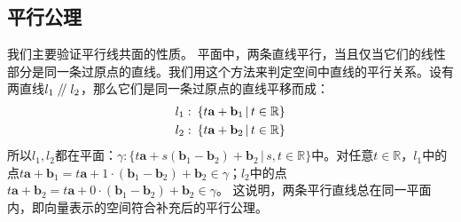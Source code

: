 \documentclass[12pt,UTF8]{ctexbook}
\renewcommand\parallel{\mathrel{/\mskip-4mu/}}
\begin{document}
\begin{appendix}
\section{平行公理}
我们主要验证平行线共面的性质。
平面中，两条直线平行，当且仅当它们的线性部分是同一条过原点的直线。我们用这个方法来判定空间中直线的平行关系。设有两直线$l_1\parallel l_2$，那么它们是同一条过原点的直线平移而成：
\begin{align}
l_1: & \,\,\, \{t\mathbf{a} + \mathbf{b}_1 \, | \, t\in\mathbb{R}\} \notag \\
l_2: & \,\,\, \{t\mathbf{a} + \mathbf{b}_2 \, | \, t\in\mathbb{R}\} \notag
\end{align}
所以$l_1,l_2$都在平面：$\gamma : \{t\mathbf{a} + s(\mathbf{b}_1 - \mathbf{b}_2) + \mathbf{b}_2 \, | \, s,t\in\mathbb{R}\}$中。对任意$t\in\mathbb{R}$，$l_1$中的点$t\mathbf{a} + \mathbf{b}_1 = t\mathbf{a} + 1\cdot(\mathbf{b}_1 - \mathbf{b}_2) + \mathbf{b}_2 \in \gamma$；$l_2$中的点$t\mathbf{a} + \mathbf{b}_2 = t\mathbf{a} + 0\cdot(\mathbf{b}_1 - \mathbf{b}_2) + \mathbf{b}_2 \in \gamma$。
这说明，两条平行直线总在同一平面内，即向量表示的空间符合补充后的平行公理。

\end{appendix}
\end{document}
